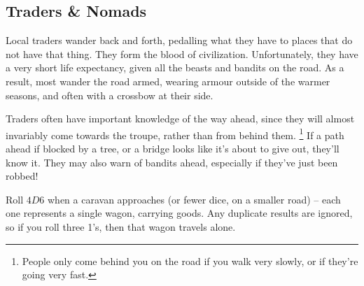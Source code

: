 \begin{multicols}{2}
\encBandits

\subsection{Traders \& Nomads}

Local traders wander back and forth, pedalling what they have to places that do not have that thing.
They form the blood of civilization.
Unfortunately, they have a very short life expectancy, given all the beasts and bandits on the road.
As a result, most wander the road armed, wearing armour outside of the warmer seasons, and often with a crossbow at their side.

Traders often have important knowledge of the way ahead, since they will almost invariably come towards the troupe, rather than from behind them.%
\footnote{People only come behind you on the road if you walk very slowly, or if they're going very fast.}
If a path ahead if blocked by a tree, or a bridge looks like it's about to give out, they'll know it.
They may also warn of bandits ahead, especially if they've just been robbed!

Roll $4D6$ when a caravan approaches (or fewer dice, on a smaller road) -- each one represents a single wagon, carrying goods.
Any duplicate results are ignored, so if you roll three 1's, then that wagon travels alone.

\encTraders

\end{multicols}

